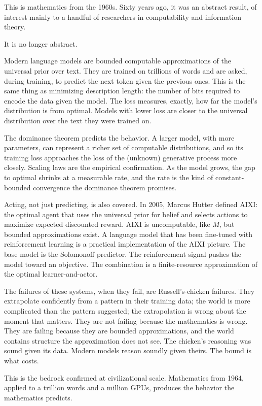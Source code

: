 This is mathematics from the 1960s. Sixty years ago, it was an abstract result, of interest mainly to a handful of researchers in computability and information theory.

It is no longer abstract.

Modern language models are bounded computable approximations of the universal prior over text. They are trained on trillions of words and are asked, during training, to predict the next token given the previous ones. This is the same thing as minimizing description length: the number of bits required to encode the data given the model. The loss measures, exactly, how far the model's distribution is from optimal. Models with lower loss are closer to the universal distribution over the text they were trained on.

The dominance theorem predicts the behavior. A larger model, with more parameters, can represent a richer set of computable distributions, and so its training loss approaches the loss of the (unknown) generative process more closely. Scaling laws are the empirical confirmation. As the model grows, the gap to optimal shrinks at a measurable rate, and the rate is the kind of constant-bounded convergence the dominance theorem promises.

Acting, not just predicting, is also covered. In 2005, Marcus Hutter defined AIXI: the optimal agent that uses the universal prior for belief and selects actions to maximize expected discounted reward. AIXI is uncomputable, like $M$, but bounded approximations exist. A language model that has been fine-tuned with reinforcement learning is a practical implementation of the AIXI picture. The base model is the Solomonoff predictor. The reinforcement signal pushes the model toward an objective. The combination is a finite-resource approximation of the optimal learner-and-actor.

The failures of these systems, when they fail, are Russell's-chicken failures. They extrapolate confidently from a pattern in their training data; the world is more complicated than the pattern suggested; the extrapolation is wrong about the moment that matters. They are not failing because the mathematics is wrong. They are failing because they are bounded approximations, and the world contains structure the approximation does not see. The chicken's reasoning was sound given its data. Modern models reason soundly given theirs. The bound is what costs.

This is the bedrock confirmed at civilizational scale. Mathematics from 1964, applied to a trillion words and a million GPUs, produces the behavior the mathematics predicts.

